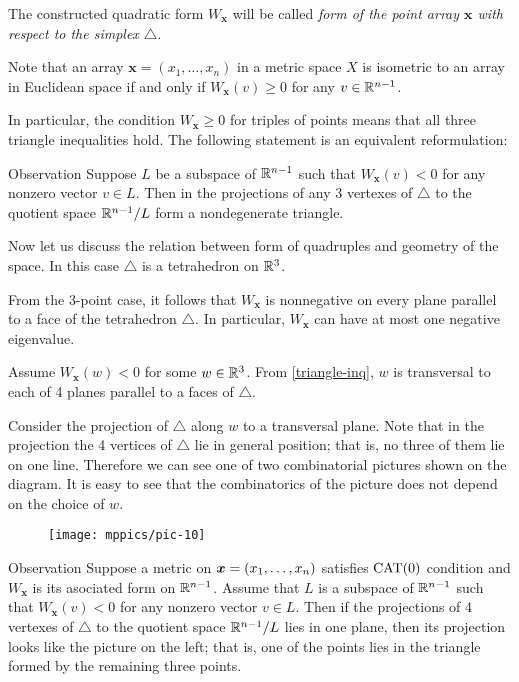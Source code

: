 \documentclass{article}
\begin{document}
The constructed quadratic form $W_{\bm{x}}$ will be called \emph{form of the point array $\bm{x}$ with respect to the simplex $\triangle$}.

Note that an array $\bm{x}=(x_1,\dots,x_n)$ in a metric space $X$ is isometric to an array in Euclidean space if and only if 
$W_{\bm{x}}(v)\ge 0$
for any $v\in \mathbb{R}^{n-1}$.

In particular,  the
condition $W_{\bm{x}}\ge 0$ for triples of points means that 
all three triangle inequalities hold.
The following statement is an equivalent reformulation:

\begin{thm}{Observation}\label{triangle-inq}
Suppose $L$ be a subspace of $\mathbb{R}^{n-1}$ such that
$W_{\bm{x}}(v)< 0$ for any nonzero vector $v\in L$.
Then in the projections of any 3 vertexes of $\triangle$ to the quotient space $\mathbb{R}^{n-1}/L$ form a nondegenerate triangle.
\end{thm}

Now let us discuss the relation between form of quadruples
and geometry of the space.
In this case $\triangle$ is a tetrahedron on $\mathbb{R}^3$.

From the $3$-point case, 
it follows that $W_{\bm{x}}$ 
is nonnegative on every plane parallel to a face of the tetrahedron $\triangle$.
In particular, $W_{\bm{x}}$ can have at most one negative eigenvalue.

Assume $W_{\bm{x}}(w)<0$ for some $w\in\mathbb{R}^3$.
From \ref{triangle-inq},
$w$ is transversal to each of 4 planes parallel to a faces of $\triangle$.

Consider the projection of $\triangle$ along $w$ to a transversal plane. 
Note that in the projection the 4 vertices of $\triangle$ lie in general position; 
that is, no three of them lie on one line.
Therefore  we can see one of two combinatorial pictures shown on the diagram.
It is easy to see that the combinatorics of the picture does not depend on the choice of $w$.

\begin{wrapfigure}{r}{33mm}
\vskip-4mm
\centering
\texttt{[image: mppics/pic-10]}
\end{wrapfigure}


\begin{thm}{Observation}\label{cat0-proj}
Suppose a metric on $\bm{x}\z=(x_1,\dots,x_n)$ satisfies $\mathrm{CAT}(0)$ condition
and $W_{\bm{x}}$ is its asociated form on $\mathbb{R}^{n-1}$.
Assume that $L$ is a subspace of $\mathbb{R}^{n-1}$ such that
$W_{\bm{x}}(v)< 0$ for any nonzero vector $v\in L$.
Then if the projections of 4 vertexes of $\triangle$ to the quotient space $\mathbb{R}^{n-1}/L$ lies in one plane, then its projection looks like the picture on the left;
that is, one of the points lies in the triangle formed by the remaining three points.
\end{thm}
\end{document}
